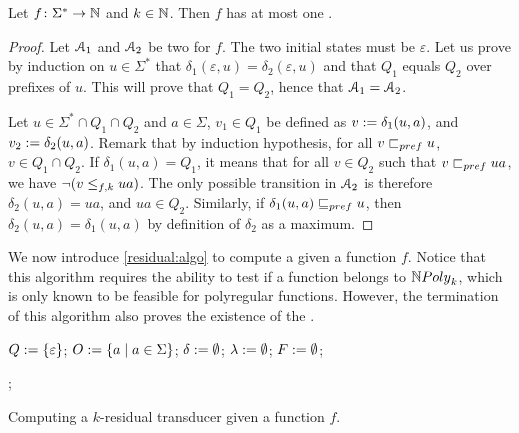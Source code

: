 \begin{fact}
    \label{unique-res-transducer:fact}
    Let $f \colon \Sigma^* \to \mathbb{N}$ and $k \in \mathbb{N}$.
    Then $f$ has at most one .
\end{fact}
\begin{proof}
    Let $\mathcal{A}_1$ and $\mathcal{A}_2$ be two
     for $f$.
    The two initial states must be $\varepsilon$.
    Let us prove by induction on $u \in \Sigma^*$ that
    $\delta_1(\varepsilon, u) = \delta_2(\varepsilon, u)$
    and that $Q_1$ equals $Q_2$ over prefixes of $u$.
    This will prove that 
    $Q_1 = Q_2$, hence that $\mathcal{A}_1 = \mathcal{A}_2$.

    Let $u \in \Sigma^* \cap Q_1 \cap Q_2$ and $a \in \Sigma$, $v_1 \in Q_1$ be
    defined as $v \mathrel{:=} \delta_1(u,a)$, and $v_2 \mathrel{:=} \delta_2(u,a)$.
    Remark that by induction hypothesis, for all $v \prefle u$, $v \in Q_1 \cap
    Q_2$. If $\delta_1(u,a) = Q_1$, it means that for all $v \in Q_2$ such that
    $v \prefle ua$, we have $\neg( v \mathrel{\leq_{{f},{k}}} ua )$. The only possible
    transition in $\mathcal{A}_2$ is therefore $\delta_2(u,a) = ua$, and $ua \in
    Q_2$. Similarly, if $\delta_1(u,a) \prefleq u$, then $\delta_2(u,a) =
    \delta_1(u,a)$ by definition of $\delta_2$ as a maximum.
\end{proof}

We now introduce \cref{residual:algo} to compute a 
given a function $f$. Notice that this algorithm requires the ability to test
if a function belongs to $\NPoly[k]$, which is only known to be feasible for
 polyregular functions. However, the termination of this
algorithm also proves the existence of the .


\begin{algorithm}
    $Q \mathrel{:=} \{ \varepsilon \}$;
    $O \mathrel{:=} \mathopen{\{}  a  \mid  a \in \Sigma \mathclose{\}}$;
    $\delta \mathrel{:=} \emptyset$;
    $\lambda \mathrel{:=} \emptyset$;
    $F \mathrel{:=} \emptyset$;

    ;
    \caption{Computing a $k$-residual transducer given a function $f$.}
    \label{residual:algo}
\end{algorithm}

